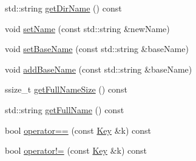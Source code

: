 \begin{DoxyCompactItemize}
\begin{DoxyCompactList}\small\item\em \end{DoxyCompactList}\item 
std\-::string \hyperlink{classkdb_1_1Key_acac95fce9ab102d35a4b6e773a7e949a}{get\-Dir\-Name} () const 
\item 
void \hyperlink{classkdb_1_1Key_aac3b5d3a854d02187484bfbdbdf975af}{set\-Name} (const std\-::string \&new\-Name)
\begin{DoxyCompactList}\small\item\em \end{DoxyCompactList}\item 
void \hyperlink{classkdb_1_1Key_a0c8c7cef03d6482d89973be72fb3c8b8}{set\-Base\-Name} (const std\-::string \&base\-Name)
\begin{DoxyCompactList}\small\item\em \end{DoxyCompactList}\item 
void \hyperlink{classkdb_1_1Key_ad2f72ce0985413ce588dc33a575ea306}{add\-Base\-Name} (const std\-::string \&base\-Name)
\begin{DoxyCompactList}\small\item\em \end{DoxyCompactList}\item 
ssize\-\_\-t \hyperlink{classkdb_1_1Key_a4b5c13b86402dffa0845a6044cd57b39}{get\-Full\-Name\-Size} () const 
\begin{DoxyCompactList}\small\item\em \end{DoxyCompactList}\item 
std\-::string \hyperlink{classkdb_1_1Key_ab94686ea0b459e5a383942ec322d9c6e}{get\-Full\-Name} () const 
\begin{DoxyCompactList}\small\item\em \end{DoxyCompactList}\item 
bool \hyperlink{classkdb_1_1Key_abaff8356eb91a6d3aed2b6d282269da2}{operator==} (const \hyperlink{classkdb_1_1Key}{Key} \&k) const 
\begin{DoxyCompactList}\small\item\em \end{DoxyCompactList}\item 
bool \hyperlink{classkdb_1_1Key_a313a84b686a72769ecf4c368a79d492c}{operator!=} (const \hyperlink{classkdb_1_1Key}{Key} \&k) const 
\begin{DoxyCompactList}\small\item\em \end{DoxyCompactList}\item 

\end{DoxyCompactItemize}
